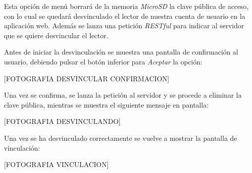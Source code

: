 \begin{itemize}
        Esta opción de menú borrará de la memoria \emph{MicroSD} la clave pública de acceso, con lo cual se quedará desvinculado el lector de nuestra cuenta de usuario en la aplicación web. Además se lanza una petición \emph{RESTful} para indicar al servidor que se quiere desvincular el lector.

        Antes de iniciar la desvinculación se muestra una pantalla de confirmación al usuario, debiendo pulsar el botón inferior para \emph{Aceptar} la opción:

        [FOTOGRAFIA DESVINCULAR CONFIRMACION]

        Una vez se confirma, se lanza la petición al servidor y se procede a eliminar la clave pública, mientras se muestra el siguiente mensaje en pantalla:

        [FOTOGRAFIA DESVINCULANDO]

        Una vez se ha desvinculado correctamente se vuelve a mostrar la pantalla de vinculación:

        [FOTOGRAFIA VINCULACION]

\end{itemize}